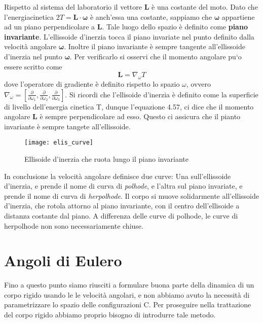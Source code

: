 \noindent Rispetto al sistema del laboratorio il vettore $\bm{L}$ \`{e} una costante del moto. Dato che l'energiacinetica $2T = \bm{L} \cdot \bm{\omega}$ \`{e} anch'essa una costante, sappiamo che $\bm{\omega} $ appartiene ad un piano perpendicolare a $\bm{L}$. Tale luogo dello spazio \`{e} definito come \textbf{piano invariante}. L'ellissoide d'inerzia tocca il piano invariate  nel punto definito dalla velocit\`{a} angolare $\bm{\omega}$. Inoltre il piano invariante \`{e} sempre tangente all'ellissoide d'inerzia nel punto $\bm{\omega}$. Per verificarlo si osservi che il momento angolare pu`{o} essere scritto come 
\begin{equation}
	\bm{L} = \nabla_{\omega}T
\end{equation}
dove l'operatore di gradiente \`{e} definito rispetto lo spazio $\omega $, ovvero $\nabla_{\omega} = \left [ \frac{\partial }{\partial \omega_1}, \frac{\partial}{\partial \omega_2},\frac{\partial}{\partial \omega_3} \right ] $. Si ricordi che l'ellisoide d'inerzia \`{e} definito come la superficie di livello dell'energia cinetica T, dunque l'equazione 4.57, ci dice che il momento angolare $\bm{L}$ \`{e} sempre perpendicolare ad esso. Questo ci assicura che il pianto invariante \`{e} sempre tangete all'ellissoide.
 
\begin{figure}[!ht]
\vspace{0.1in}
\texttt{[image: elis\_curve]}	
\centering
\vspace{0.1in}
\caption{Ellisoide d'inerzia che ruota lungo il piano invariante}
\end{figure}
In conclusione la velocit\`{a} angolare definisce due curve: Una sull'ellissoide d'inerzia, e prende il nome di curva di \textit{ polhode}, e l'altra sul piano invariate, e prende il nome di curva di \textit{herpolhode}. Il corpo si muove solidarmente all'ellissoide d'inerzia, che rotola attorno al piano invariante, con il centro dell'ellisoide a distanza costante dal piano. A differenza delle curve di polhode, le curve di herpolhode non sono necessariamente chiuse.
\newpage 


\section{Angoli di Eulero}

Fino a questo punto siamo riusciti a formulare buona parte della dinamica di un corpo rigido usando le le velocit\`{a} angolari, e non abbiamo avuto la necessit\`{a} di parametrizzare lo spazio delle configurazioni C. Per proseguire nella trattazione del corpo rigido abbiamo proprio bisogno di introdurre tale metodo.

